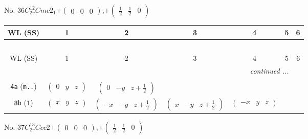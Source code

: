 \documentclass[fleqn,9pt,landscape]{jsarticle}
\begin{document}
\newpage
No. 36\quad$C_{2v}^{12}$\quad$Cmc2_1$\quad[ orthorhombic ]\quad$+\begin{pmatrix} 0 & 0 & 0 \end{pmatrix}$,\quad $+\begin{pmatrix} \frac{1}{2} & \frac{1}{2} & 0 \end{pmatrix}$
\begin{center}
\renewcommand{\arraystretch}{1.2}
\begin{longtable}{ccccccc}
 \hline \hline
WL (SS) & 1 & 2 & 3 & 4 & 5 & 6 \\ \hline \endfirsthead

\multicolumn{6}{l}{\tablename\ \thetable{}} \\
 \hline \hline
WL (SS) & 1 & 2 & 3 & 4 & 5 & 6 \\ \hline \endhead

 \hline \hline
\multicolumn{6}{r}{\footnotesize\it continued ...} \\ \endfoot

 \hline \hline
\multicolumn{6}{r}{} \\ \endlastfoot

{\tt 4a} ({\tt m..}) & $ \begin{pmatrix} 0 & y & z \end{pmatrix} $ & $ \begin{pmatrix} 0 & - y & z + \frac{1}{2} \end{pmatrix} $ & $  $ & $  $ \\ \hline
{\tt 8b} ({\tt 1}) & $ \begin{pmatrix} x & y & z \end{pmatrix} $ & $ \begin{pmatrix} - x & - y & z + \frac{1}{2} \end{pmatrix} $ & $ \begin{pmatrix} x & - y & z + \frac{1}{2} \end{pmatrix} $ & $ \begin{pmatrix} - x & y & z \end{pmatrix} $ \\
\end{longtable}
\end{center}
\newpage
No. 37\quad$C_{2v}^{13}$\quad$Ccc2$\quad[ orthorhombic ]\quad$+\begin{pmatrix} 0 & 0 & 0 \end{pmatrix}$,\quad $+\begin{pmatrix} \frac{1}{2} & \frac{1}{2} & 0 \end{pmatrix}$
\end{document}
